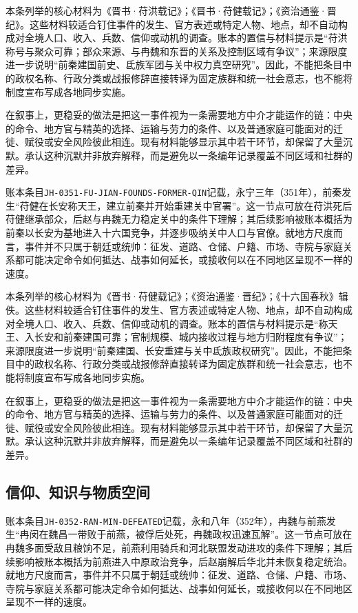 本条列举的核心材料为《晋书·苻洪载记》；《晋书·苻健载记》；《资治通鉴·晋纪》。这些材料较适合钉住事件的发生、官方表述或特定人物、地点，却不自动构成对全境人口、收入、兵数、信仰或动机的调查。账本的置信与材料提示是“苻洪称号与聚众可靠；部众来源、与冉魏和东晋的关系及控制区域有争议”；来源限度进一步说明“前秦建国前史、氐族军团与关中权力真空研究”。因此，不能把条目中的政权名称、行政分类或战报修辞直接转译为固定族群和统一社会意志，也不能将制度宣布写成各地同步实施。

在叙事上，更稳妥的做法是把这一事件视为一条需要地方中介才能运作的链：中央的命令、地方官与精英的选择、运输与劳力的条件、以及普通家庭可能面对的迁徙、赋役或安全风险彼此相连。现有材料能够显示其中若干环节，却保留了大量沉默。承认这种沉默并非放弃解释，而是避免以一条编年记录覆盖不同区域和社群的差异。

账本条目\texttt{JH-0351-FU-JIAN-FOUNDS-FORMER-QIN}记载，永宁三年（351年），前秦发生“苻健在长安称天王，建立前秦并开始重建关中官署”。这一节点可放在苻洪死后苻健继承部众，后赵与冉魏无力稳定关中的条件下理解；其后续影响被账本概括为前秦以长安为基地进入十六国竞争，并逐步吸纳关中人口与官僚。就地方尺度而言，事件并不只属于朝廷或统帅：征发、道路、仓储、户籍、市场、寺院与家庭关系都可能决定命令如何抵达、战事如何延长，或接收何以在不同地区呈现不一样的速度。

本条列举的核心材料为《晋书·苻健载记》；《资治通鉴·晋纪》；《十六国春秋》辑佚。这些材料较适合钉住事件的发生、官方表述或特定人物、地点，却不自动构成对全境人口、收入、兵数、信仰或动机的调查。账本的置信与材料提示是“称天王、入长安和前秦建国可靠；官制规模、城内接收过程与地方归附程度有争议”；来源限度进一步说明“前秦建国、长安重建与关中氐族政权研究”。因此，不能把条目中的政权名称、行政分类或战报修辞直接转译为固定族群和统一社会意志，也不能将制度宣布写成各地同步实施。

在叙事上，更稳妥的做法是把这一事件视为一条需要地方中介才能运作的链：中央的命令、地方官与精英的选择、运输与劳力的条件、以及普通家庭可能面对的迁徙、赋役或安全风险彼此相连。现有材料能够显示其中若干环节，却保留了大量沉默。承认这种沉默并非放弃解释，而是避免以一条编年记录覆盖不同区域和社群的差异。

\subsection{信仰、知识与物质空间}

账本条目\texttt{JH-0352-RAN-MIN-DEFEATED}记载，永和八年（352年），冉魏与前燕发生“冉闵在魏昌一带败于前燕，被俘后处死，冉魏政权迅速瓦解”。这一节点可放在冉魏多面受敌且粮饷不足，前燕利用骑兵和河北联盟发动进攻的条件下理解；其后续影响被账本概括为前燕进入中原政治竞争，后赵崩解后华北并未恢复稳定统治。就地方尺度而言，事件并不只属于朝廷或统帅：征发、道路、仓储、户籍、市场、寺院与家庭关系都可能决定命令如何抵达、战事如何延长，或接收何以在不同地区呈现不一样的速度。

